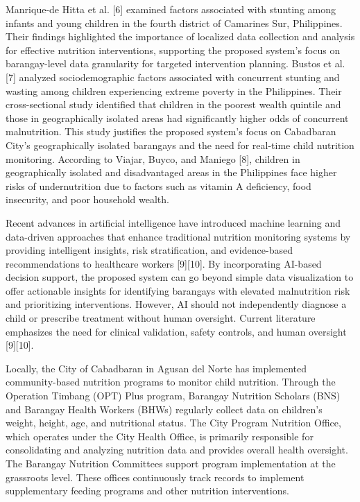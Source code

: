 \documentclass[12pt, a4paper]{report}
\begin{document}
Manrique-de Hitta et al. [6] examined factors associated with stunting among infants and young children in the fourth district of Camarines Sur, Philippines. Their findings highlighted the importance of localized data collection and analysis for effective nutrition interventions, supporting the proposed system's focus on barangay-level data granularity for targeted intervention planning. Bustos et al. [7] analyzed sociodemographic factors associated with concurrent stunting and wasting among children experiencing extreme poverty in the Philippines. Their cross-sectional study identified that children in the poorest wealth quintile and those in geographically isolated areas had significantly higher odds of concurrent malnutrition. This study justifies the proposed system's focus on Cabadbaran City's geographically isolated barangays and the need for real-time child nutrition monitoring. According to Viajar, Buyco, and Maniego [8], children in geographically isolated and disadvantaged areas in the Philippines face higher risks of undernutrition due to factors such as vitamin A deficiency, food insecurity, and poor household wealth.

Recent advances in artificial intelligence have introduced machine learning and data-driven approaches that enhance traditional nutrition monitoring systems by providing intelligent insights, risk stratification, and evidence-based recommendations to healthcare workers [9][10]. By incorporating AI-based decision support, the proposed system can go beyond simple data visualization to offer actionable insights for identifying barangays with elevated malnutrition risk and prioritizing interventions. However, AI should not independently diagnose a child or prescribe treatment without human oversight. Current literature emphasizes the need for clinical validation, safety controls, and human oversight [9][10].

Locally, the City of Cabadbaran in Agusan del Norte has implemented community-based nutrition programs to monitor child nutrition. Through the Operation Timbang (OPT) Plus program, Barangay Nutrition Scholars (BNS) and Barangay Health Workers (BHWs) regularly collect data on children's weight, height, age, and nutritional status. The City Program Nutrition Office, which operates under the City Health Office, is primarily responsible for consolidating and analyzing nutrition data and provides overall health oversight. The Barangay Nutrition Committees support program implementation at the grassroots level. These offices continuously track records to implement supplementary feeding programs and other nutrition interventions.
\end{document}

